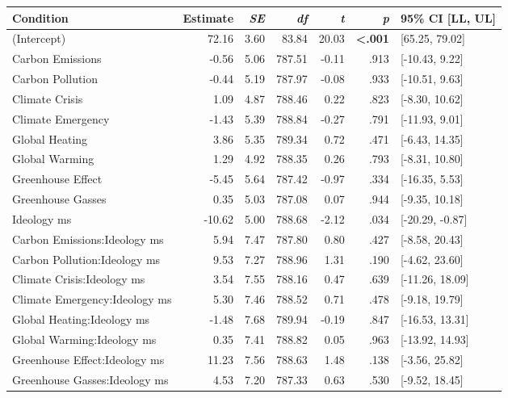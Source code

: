 \begin{table}[ht]
\centering
\begin{tabular}{lrrrrrl}
  \hline
Condition & Estimate & \textit{SE} & \textit{df} & \textit{t} & \textit{p} & 95\% CI [LL, UL] \\ 
  \hline
(Intercept) & 72.16 & 3.60 & 83.84 & 20.03 & \textbf{\textless  .001} & [65.25, 79.02] \\ 
  Carbon Emissions & -0.56 & 5.06 & 787.51 & -0.11 & .913 & [-10.43, 9.22] \\ 
  Carbon Pollution & -0.44 & 5.19 & 787.97 & -0.08 & .933 & [-10.51, 9.63] \\ 
  Climate Crisis & 1.09 & 4.87 & 788.46 & 0.22 & .823 & [-8.30, 10.62] \\ 
  Climate Emergency & -1.43 & 5.39 & 788.84 & -0.27 & .791 & [-11.93, 9.01] \\ 
  Global Heating & 3.86 & 5.35 & 789.34 & 0.72 & .471 & [-6.43, 14.35] \\ 
  Global Warming & 1.29 & 4.92 & 788.35 & 0.26 & .793 & [-8.31, 10.80] \\ 
  Greenhouse Effect & -5.45 & 5.64 & 787.42 & -0.97 & .334 & [-16.35, 5.53] \\ 
  Greenhouse Gasses & 0.35 & 5.03 & 787.08 & 0.07 & .944 & [-9.35, 10.18] \\ 
  Ideology ms & -10.62 & 5.00 & 788.68 & -2.12 & .034 & [-20.29, -0.87] \\ 
  Carbon Emissions:Ideology ms & 5.94 & 7.47 & 787.80 & 0.80 & .427 & [-8.58, 20.43] \\ 
  Carbon Pollution:Ideology ms & 9.53 & 7.27 & 788.96 & 1.31 & .190 & [-4.62, 23.60] \\ 
  Climate Crisis:Ideology ms & 3.54 & 7.55 & 788.16 & 0.47 & .639 & [-11.26, 18.09] \\ 
  Climate Emergency:Ideology ms & 5.30 & 7.46 & 788.52 & 0.71 & .478 & [-9.18, 19.79] \\ 
  Global Heating:Ideology ms & -1.48 & 7.68 & 789.94 & -0.19 & .847 & [-16.53, 13.31] \\ 
  Global Warming:Ideology ms & 0.35 & 7.41 & 788.82 & 0.05 & .963 & [-13.92, 14.93] \\ 
  Greenhouse Effect:Ideology ms & 11.23 & 7.56 & 788.63 & 1.48 & .138 & [-3.56, 25.82] \\ 
  Greenhouse Gasses:Ideology ms & 4.53 & 7.20 & 787.33 & 0.63 & .530 & [-9.52, 18.45] \\ 
   \hline
\end{tabular}
\end{table}
